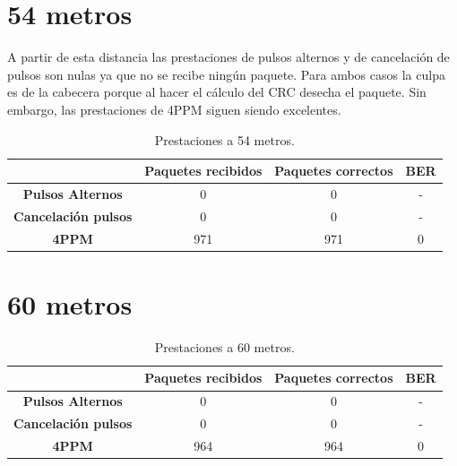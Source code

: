 \section{54 metros}

A partir de esta distancia las prestaciones de pulsos alternos y de cancelación de 
pulsos son nulas ya que no se recibe ningún paquete. Para ambos casos la culpa es de 
la cabecera porque al hacer el cálculo del CRC desecha el paquete. 
Sin embargo, las prestaciones de 4PPM siguen siendo excelentes.

\begin{table}[ht]
	\begin{tabular}{c|c|c|c|}
	\cline{2-4}
														 & \textbf{Paquetes recibidos} & \textbf{Paquetes correctos} & \textbf{BER} \\ \hline
	\multicolumn{1}{|c|}{\textbf{Pulsos Alternos}}       & 0                           & 0                           & -            \\ \hline
	\multicolumn{1}{|c|}{\textbf{Cancelación pulsos}} 	 & 0                           & 0                           & -            \\ \hline
	\multicolumn{1}{|c|}{\textbf{4PPM}}                  & 971                         & 971                         & 0            \\ \hline
	\end{tabular}
	\caption{\small{Prestaciones a 54 metros.}}
	\end{table}

\section{60 metros}

\begin{table}[ht]
	\begin{tabular}{c|c|c|c|}
	\cline{2-4}
														 & \textbf{Paquetes recibidos} & \textbf{Paquetes correctos} & \textbf{BER} \\ \hline
	\multicolumn{1}{|c|}{\textbf{Pulsos Alternos}}       & 0                           & 0                           & -            \\ \hline
	\multicolumn{1}{|c|}{\textbf{Cancelación pulsos}} 	 & 0                           & 0                           & -            \\ \hline
	\multicolumn{1}{|c|}{\textbf{4PPM}}                  & 964                         & 964                         & 0            \\ \hline
	\end{tabular}
	\caption{\small{Prestaciones a 60 metros.}}
	\end{table}

